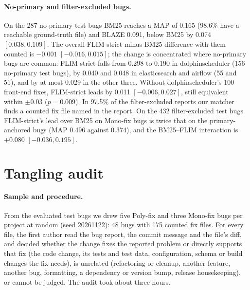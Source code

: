 \documentclass[10pt,a4paper]{article}
\begin{document}
\paragraph{No-primary and filter-excluded bugs.} On the 287 no-primary test bugs
BM25 reaches a MAP of 0.165 (98.6\% have a reachable ground-truth file) and BLAZE
0.091, below BM25 by 0.074 $[0.038, 0.109]$. The overall FLIM-strict minus BM25
difference with them counted is $-0.001$ $[-0.016, 0.015]$; the change is
concentrated where no-primary bugs are common: FLIM-strict falls from 0.298 to
0.190 in dolphinscheduler (156 no-primary test bugs), by 0.040 and 0.048 in
elasticsearch and airflow (55 and 51), and by at most 0.029 in the other three.
Without dolphinscheduler's 100 front-end fixes, FLIM-strict leads by 0.011
$[-0.006, 0.027]$, still equivalent within $\pm0.03$ ($p=0.009$). In 97.5\% of
the filter-excluded reports our matcher finds a counted fix file named in the
report. On the 432 filter-excluded test bugs FLIM-strict's lead over BM25 on
Mono-fix bugs is twice that on the primary-anchored bugs (MAP 0.496 against
0.374), and the BM25--FLIM interaction is $+0.080$ $[-0.036, 0.195]$.

\section{Tangling audit}\label{app:tangling}

\paragraph{Sample and procedure.} From the evaluated test bugs we drew five
Poly-fix and three Mono-fix bugs per project at random (seed 20261122): 48 bugs
with 175 counted fix files. For every file, the first author read the bug
report, the commit message and the file's diff, and decided whether the change
fixes the reported problem or directly supports that fix (the code change, its
tests and test data, configuration, schema or build changes the fix needs), is
unrelated (refactoring or cleanup, another feature, another bug, formatting, a
dependency or version bump, release housekeeping), or cannot be judged. The
audit took about three hours.
\end{document}
